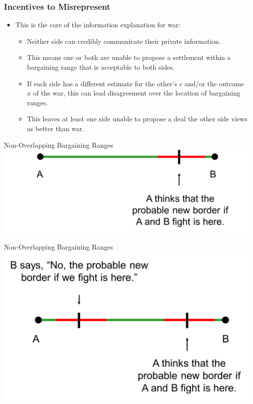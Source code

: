 \documentclass[handout]{beamer}
\begin{document}
\begin{frame} 
	\frametitle{\LARGE{Incentives to Misrepresent}}
	\begin{itemize}
		\item This is the core of the information explanation for war: 
		\begin{itemize}
			\item Neither side can credibly communicate their private information.
			\item This means one or both are unable to propose a settlement within a bargaining range that is acceptable to both sides. \pause
			\item If each side has a different estimate for the other's $c$ and/or the outcome $x$ of the war, this can lead disagreement over the location of bargaining ranges. \pause
			\item This leaves at least one side unable to propose a deal the other side views as better than war. 
		\end{itemize}
	\end{itemize}
\end{frame}

\begin{frame}{Non-Overlapping Bargaining Ranges}
	\centering
	\includegraphics[width=\textwidth,height=0.8\textheight,keepaspectratio]{Bluff1.png}
\end{frame}


\begin{frame}{Non-Overlapping Bargaining Ranges}
	\centering
	\includegraphics[width=\textwidth,height=0.8\textheight,keepaspectratio]{Bluff2.png}
\end{frame}
\end{document}
